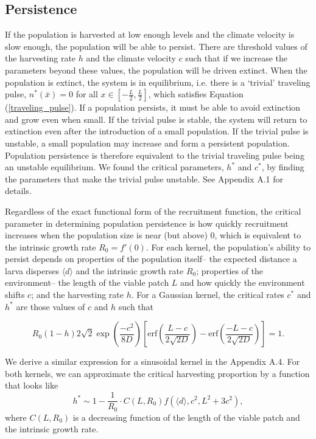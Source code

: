 \documentclass[12pt,english]{article}
\begin{document}
\begin{spacing}{1.9}
\begin{flushleft}
\subsection{Persistence }
If the population is harvested at low enough levels and the climate velocity is slow enough, the population will be able to persist.  There are threshold values of the harvesting rate $h$ and the climate velocity $c$ such that if we increase the parameters beyond these values, the population will be driven extinct.  When the population is extinct, the system is in equilibrium, i.e. there is a `trivial' traveling pulse, $n^*(\bar{x}) = 0$ for all $x \in \left[-\frac{L}{2}, \frac{L}{2}\right]$, which satisfies Equation (\ref{traveling_pulse}).  If a population persists, it must be able to avoid extinction and grow even when small. If the trivial pulse is stable, the system will return to extinction even after the introduction of a small population. If the trivial pulse is unstable, a small population may increase and form a persistent population. Population persistence is therefore equivalent to the trivial traveling pulse being an unstable equilibrium.  We found the critical parameters, $h^*$ and  $c^*$, by finding the parameters that make the trivial pulse unstable.  See Appendix A.1 for details.

Regardless of the exact functional form of the recruitment function, the critical parameter in determining population persistence is how quickly recruitment increases when the population size is near (but above) $0$, which is equivalent to the intrinsic growth rate $R_0=f'(0)$.  For each kernel, the population's ability to persist depends on properties of the population itself-- the expected distance a larva disperses $\langle d \rangle$ and the intrinsic growth rate $R_0$; properties of the environment-- the length of the viable patch $L$ and how quickly the environment shifts $c$; and the harvesting rate $h$.  For a Gaussian kernel, the critical rates $c^*$ and $h^*$ are those values of $c$ and $h$ such that 

\[R_0(1-h)2\sqrt{2}\exp\left(\frac{-c^2}{8D}\right)\left[\text{erf}\left(\frac{L-c}{2\sqrt{2D}}\right)-\text{erf}\left(\frac{-L-c}{2\sqrt{2D}}\right)\right]=1.\]

We derive a similar expression for a sinusoidal kernel in the Appendix A.4.  For both kernels, we can approximate the critical harvesting proportion by a function that looks like 
\begin{equation*}
h^*\sim1- \frac{1}{R_0}\cdot C(L,R_0)f(\langle d \rangle,c^2,L^2+3c^2),
\end{equation*}
where $C(L,R_0)$ is a decreasing function of the length of the viable patch and the intrinsic growth rate.
   


\end{flushleft}
\end{spacing}
\end{document}
